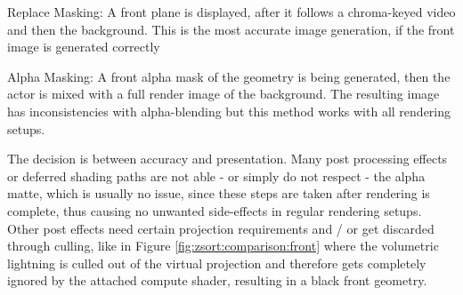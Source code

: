 \begin{my_list}
	\item Replace Masking: A front plane is displayed, after it follows a 
	chroma-keyed video and then the background. This is the most accurate image 
	generation, if the front image is generated correctly
	\item Alpha Masking: A front alpha mask of the geometry is being generated, 
	then the actor is mixed with a full render image of the background. The 
	resulting image has inconsistencies with alpha-blending but this method 
	works with all rendering setups.
\end{my_list}

The decision is between accuracy and presentation. Many post processing effects 
or deferred shading paths are not able - or simply do not respect - the alpha 
matte, which is usually no issue, since these steps are taken after rendering 
is complete, thus causing no unwanted side-effects in regular rendering setups. 
Other post effects need certain projection requirements and / or get discarded 
through culling, like in Figure \ref{fig:zsort:comparison:front} where the 
volumetric lightning is culled out of the virtual projection and therefore gets 
completely ignored by the attached compute shader, resulting in a black front 
geometry.

